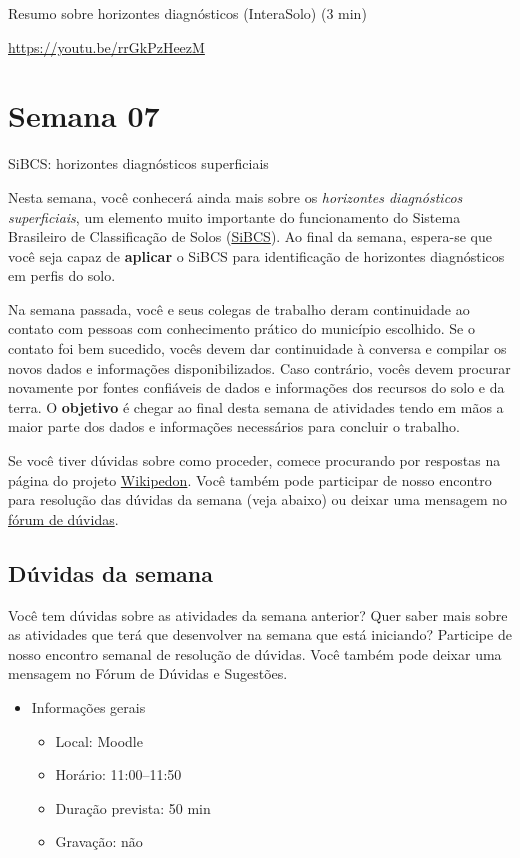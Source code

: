 \documentclass[
  11pt,
  a4paper,
  dvipsnames]{tufte-book}
\providecommand{\tightlist}{%
  \setlength{\itemsep}{0pt}\setlength{\parskip}{0pt}}
\begin{document}
Resumo sobre horizontes diagnósticos (InteraSolo) (3 min)

\url{https://youtu.be/rrGkPzHeezM}

\hypertarget{semana-07}{%
\chapter{Semana 07}\label{semana-07}}

SiBCS: horizontes diagnósticos superficiais

Nesta semana, você conhecerá ainda mais sobre os \emph{horizontes diagnósticos superficiais}, um elemento muito importante do funcionamento do Sistema Brasileiro de Classificação de Solos (\href{https://www.embrapa.br/en/solos/sibcs}{SiBCS}). Ao final da semana, espera-se que você seja capaz de \textbf{aplicar} o SiBCS para identificação de horizontes diagnósticos em perfis do solo.

Na semana passada, você e seus colegas de trabalho deram continuidade ao contato com pessoas com conhecimento prático do município escolhido. Se o contato foi bem sucedido, vocês devem dar continuidade à conversa e compilar os novos dados e informações disponibilizados. Caso contrário, vocês devem procurar novamente por fontes confiáveis de dados e informações dos recursos do solo e da terra. O \textbf{objetivo} é chegar ao final desta semana de atividades tendo em mãos a maior parte dos dados e informações necessários para concluir o trabalho.

Se você tiver dúvidas sobre como proceder, comece procurando por respostas na página do projeto \href{https://pt.wikiversity.org/wiki/Wikipedon}{Wikipedon}. Você também pode participar de nosso encontro para resolução das dúvidas da semana (veja abaixo) ou deixar uma mensagem no \href{https://moodle.utfpr.edu.br/mod/forum/view.php?id=573329}{fórum de dúvidas}.

\hypertarget{duxfavidas-da-semana-5}{%
\section{Dúvidas da semana}\label{duxfavidas-da-semana-5}}

Você tem dúvidas sobre as atividades da semana anterior? Quer saber mais sobre as atividades que terá que desenvolver na semana que está iniciando? Participe de nosso encontro semanal de resolução de dúvidas. Você também pode deixar uma mensagem no Fórum de Dúvidas e Sugestões.

\begin{itemize}
\tightlist
\item
  Informações gerais

  \begin{itemize}
  \tightlist
  \item
    Local: Moodle
  \item
    Horário: 11:00--11:50
  \item
    Duração prevista: 50 min
  \item
    Gravação: não
  \end{itemize}
\end{itemize}
\end{document}
